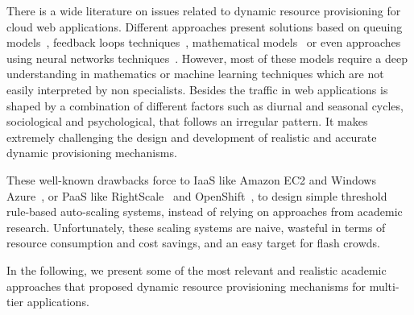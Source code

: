 
There is a wide literature on issues related to dynamic resource provisioning for cloud web applications. Different approaches present solutions based on queuing models~\cite{urgaonkar_agile_2008}, feedback loops techniques~\cite{gong_gray-box_2010}, mathematical models~\cite{muppala_regression-based_2012} or even approaches using neural networks techniques~\cite{islam_empirical_2012}. However, most of these models require a deep understanding in mathematics or machine learning techniques which are not easily interpreted by non specialists. Besides the traffic in web applications is shaped by a combination of different factors such as diurnal and seasonal cycles, sociological and psychological, that follows an irregular pattern. It makes extremely challenging the design and development of realistic and accurate dynamic provisioning mechanisms. 

These well-known drawbacks force to IaaS like Amazon EC2 and Windows Azure~\cite{azure}, or PaaS like RightScale~\cite{right-scale} and OpenShift~\cite{openshift},  to design simple threshold rule-based auto-scaling systems, instead of relying on approaches from academic research. Unfortunately, these scaling systems are naive, wasteful in terms of resource consumption and cost savings, and an easy target for flash crowds.



In the following, we present some of the most relevant and realistic academic approaches that proposed dynamic resource provisioning mechanisms for multi-tier applications. 


